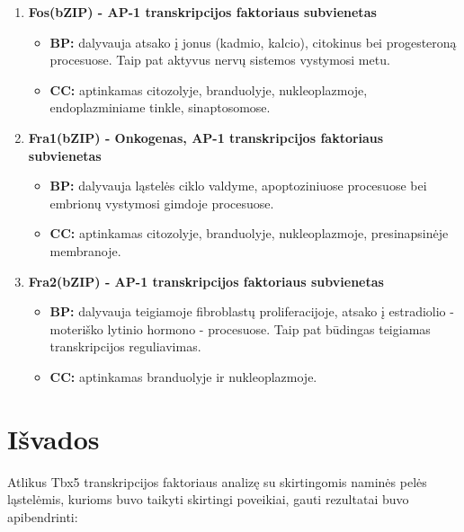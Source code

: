 \documentclass[12pt]{article}
\begin{document}
\begin{enumerate}
    \item \textbf{Fos(bZIP)\cite{FOS} - AP-1 transkripcijos
                  faktoriaus subvienetas}
        \begin{itemize}
            \item \textbf{BP:} dalyvauja atsako į jonus (kadmio, kalcio),
                citokinus bei progesteroną procesuose. Taip pat aktyvus nervų
                sistemos vystymosi metu.
            \item \textbf{CC:} aptinkamas citozolyje, branduolyje,
                nukleoplazmoje, endoplazminiame tinkle, sinaptosomose.
        \end{itemize}

    \item \textbf{Fra1(bZIP)\cite{FRA1} - Onkogenas, AP-1 transkripcijos
                  faktoriaus subvienetas}
        \begin{itemize}
            \item \textbf{BP:} dalyvauja ląstelės ciklo valdyme, apoptoziniuose
                procesuose bei embrionų vystymosi gimdoje procesuose.
            \item \textbf{CC:} aptinkamas citozolyje, branduolyje,
                nukleoplazmoje, presinapsinėje membranoje.
        \end{itemize}

    \item \textbf{Fra2(bZIP)\cite{FRA2} - AP-1 transkripcijos
                  faktoriaus subvienetas}
        \begin{itemize}
            \item \textbf{BP:} dalyvauja teigiamoje fibroblastų
                proliferacijoje, atsako į estradiolio - moteriško
                lytinio hormono - procesuose. Taip pat būdingas teigiamas
                transkripcijos reguliavimas.
            \item \textbf{CC:} aptinkamas branduolyje ir nukleoplazmoje.
        \end{itemize}
\end{enumerate}

\newpage


\section{Išvados}
Atlikus Tbx5 transkripcijos faktoriaus analizę su skirtingomis naminės pelės
ląstelėmis, kurioms buvo taikyti skirtingi poveikiai, gauti rezultatai buvo
apibendrinti:
\end{document}
